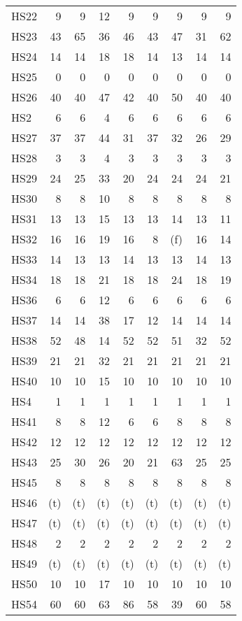 \documentclass[11pt,twoside]{article}
\begin{document}
{\begin{longtable}[c]{|l|r|r|r|r|r|r|r|r|}
 HS22 & 9 & 9 & 12 & 9 & 9 & 9 & 9 & 9 \\
 HS23 & 43 & 65 & 36 & 46 & 43 & 47 & 31 & 62 \\
 HS24 & 14 & 14 & 18 & 18 & 14 & 13 & 14 & 14 \\
 HS25 & 0 & 0 & 0 & 0 & 0 & 0 & 0 & 0 \\
 HS26 & 40 & 40 & 47 & 42 & 40 & 50 & 40 & 40 \\
 HS2 & 6 & 6 & 4 & 6 & 6 & 6 & 6 & 6 \\
 HS27 & 37 & 37 & 44 & 31 & 37 & 32 & 26 & 29 \\
 HS28 & 3 & 3 & 4 & 3 & 3 & 3 & 3 & 3 \\
 HS29 & 24 & 25 & 33 & 20 & 24 & 24 & 24 & 21 \\
 HS30 & 8 & 8 & 10 & 8 & 8 & 8 & 8 & 8 \\
 HS31 & 13 & 13 & 15 & 13 & 13 & 14 & 13 & 11 \\
 HS32 & 16 & 16 & 19 & 16 & 8 & (f) & 16 & 14 \\
 HS33 & 14 & 13 & 13 & 14 & 13 & 13 & 14 & 13 \\
 HS34 & 18 & 18 & 21 & 18 & 18 & 24 & 18 & 19 \\
 HS36 & 6 & 6 & 12 & 6 & 6 & 6 & 6 & 6 \\
 HS37 & 14 & 14 & 38 & 17 & 12 & 14 & 14 & 14 \\
 HS38 & 52 & 48 & 14 & 52 & 52 & 51 & 32 & 52 \\
 HS39 & 21 & 21 & 32 & 21 & 21 & 21 & 21 & 21 \\
 HS40 & 10 & 10 & 15 & 10 & 10 & 10 & 10 & 10 \\
 HS4 & 1 & 1 & 1 & 1 & 1 & 1 & 1 & 1 \\
 HS41 & 8 & 8 & 12 & 6 & 6 & 8 & 8 & 8 \\
 HS42 & 12 & 12 & 12 & 12 & 12 & 12 & 12 & 12 \\
 HS43 & 25 & 30 & 26 & 20 & 21 & 63 & 25 & 25 \\
 HS45 & 8 & 8 & 8 & 8 & 8 & 8 & 8 & 8 \\
 HS46 & (t) & (t) & (t) & (t) & (t) & (t) & (t) & (t) \\
 HS47 & (t) & (t) & (t) & (t) & (t) & (t) & (t) & (t) \\
 HS48 & 2 & 2 & 2 & 2 & 2 & 2 & 2 & 2 \\
 HS49 & (t) & (t) & (t) & (t) & (t) & (t) & (t) & (t) \\
 HS50 & 10 & 10 & 17 & 10 & 10 & 10 & 10 & 10 \\
 HS54 & 60 & 60 & 63 & 86 & 58 & 39 & 60 & 58 \\

\end{longtable}}
\end{document}
